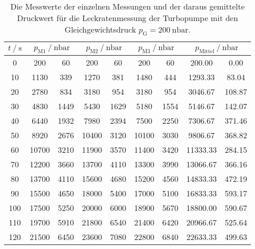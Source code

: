    \begin{table}[h]
      \centering
      \caption{Die Messwerte der einzelnen Messungen und der daraus gemittelte Druckwert für die Leckratenmessung der Turbopumpe mit den Gleichgewichtsdruck
                $p_\text{G} = \SI{200}{\nano\bar}$.}
      \label{tab:turbo_leck_2}
      \begin{tabular}{S[table-format=3.0] S @{${}\pm{}$} S S @{${}\pm{}$} S S @{${}\pm{}$} S S[table-format=5.2] @{${}\pm{}$} S[table-format=4.2]}
      \toprule
      {$t \mathbin{/} \si{\second} $} &  &  &  &  \\
         &   200 &   60 &   200 &   60 &   200 &   60 &   200.00 &   0.00 \\
      10  &  1130 &  339 &  1270 &  381 &  1480 &  444 &  1293.33 &  83.04 \\
      20  &  2780 &  834 &  3180 &  954 &  3180 &  954 &  3046.67 & 108.87 \\
      30  &  4830 & 1449 &  5430 & 1629 &  5180 & 1554 &  5146.67 & 142.07 \\
      40  &  6440 & 1932 &  7980 & 2394 &  7500 & 2250 &  7306.67 & 371.46 \\
      50  &  8920 & 2676 & 10400 & 3120 & 10100 & 3030 &  9806.67 & 368.82 \\
      60  & 10700 & 3210 & 11900 & 3570 & 11400 & 3420 & 11333.33 & 284.15 \\
      70  & 12200 & 3660 & 13700 & 4110 & 13300 & 3990 & 13066.67 & 366.16 \\
      80  & 13700 & 4110 & 15600 & 4680 & 15200 & 4560 & 14833.33 & 472.19 \\
      90  & 15500 & 4650 & 18000 & 5400 & 17000 & 5100 & 16833.33 & 593.17 \\
      100 & 17500 & 5250 & 20000 & 6000 & 18900 & 5670 & 18800.00 & 590.67 \\
      110 & 19700 & 5910 & 21800 & 6540 & 21400 & 6420 & 20966.67 & 525.64 \\
      120 & 21500 & 6450 & 23600 & 7080 & 22800 & 6840 & 22633.33 & 499.63 \\
      \bottomrule
      \end{tabular}
    \end{table}

